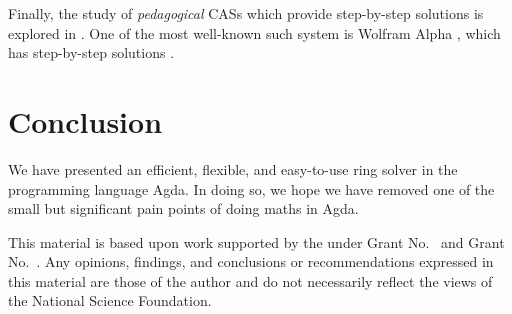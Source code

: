 \documentclass[acmsmall,review,anonymous]{acmart}\settopmatter{printfolios=true,printccs=false,printacmref=false}
\theoremstyle{remark}
\begin{document}
Finally, the study of \emph{pedagogical} CASs which provide step-by-step
solutions is explored in \citet{lioubartsev_constructing_2016}. One of the most
well-known such system is Wolfram Alpha
\cite{wolfram_research_inc._wolframalpha_2019}, which has step-by-step solutions
\cite{the_development_team_step-by-step_2009}.

\section{Conclusion}
We have presented an efficient, flexible, and easy-to-use ring solver in the
programming language Agda. In doing so, we hope we have removed one of the small
but significant pain points of doing maths in Agda.




\begin{acks}                            %
  This material is based upon work supported by the
   under Grant
  No.~ and Grant
  No.~.  Any opinions, findings, and
  conclusions or recommendations expressed in this material are those
  of the author and do not necessarily reflect the views of the
  National Science Foundation.
\end{acks}




\end{document}
